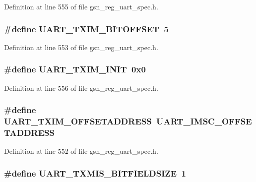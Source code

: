 Definition at line 555 of file gsn\_\-reg\_\-uart\_\-spec.h.

\hypertarget{a00575_a9732269606e7783cc0ff873d246391bd}{
\subsubsection[{UART\_\-TXIM\_\-BITOFFSET}]{\setlength{\rightskip}{0pt plus 5cm}\#define UART\_\-TXIM\_\-BITOFFSET~5}}
\label{a00575_a9732269606e7783cc0ff873d246391bd}


Definition at line 553 of file gsn\_\-reg\_\-uart\_\-spec.h.

\hypertarget{a00575_aa63c184a5b6142f51df0dacda54d49a8}{
\subsubsection[{UART\_\-TXIM\_\-INIT}]{\setlength{\rightskip}{0pt plus 5cm}\#define UART\_\-TXIM\_\-INIT~0x0}}
\label{a00575_aa63c184a5b6142f51df0dacda54d49a8}


Definition at line 556 of file gsn\_\-reg\_\-uart\_\-spec.h.

\hypertarget{a00575_aa73197a589b4d692d8a5d90ac7111316}{
\subsubsection[{UART\_\-TXIM\_\-OFFSETADDRESS}]{\setlength{\rightskip}{0pt plus 5cm}\#define UART\_\-TXIM\_\-OFFSETADDRESS~UART\_\-IMSC\_\-OFFSETADDRESS}}
\label{a00575_aa73197a589b4d692d8a5d90ac7111316}


Definition at line 552 of file gsn\_\-reg\_\-uart\_\-spec.h.

\hypertarget{a00575_a70a885189e6bce037c924f5ea792365d}{
\subsubsection[{UART\_\-TXMIS\_\-BITFIELDSIZE}]{\setlength{\rightskip}{0pt plus 5cm}\#define UART\_\-TXMIS\_\-BITFIELDSIZE~1}}
\label{a00575_a70a885189e6bce037c924f5ea792365d}


